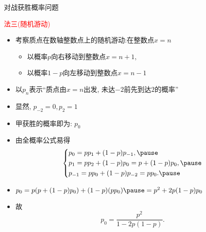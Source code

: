 \begin{frame}{对战获胜概率问题}
	\begin{jieda}
		\textcolor{red}{法三(随机游动)}
		\begin{itemize}[<+-|alert@+>]
			\item 考察质点在数轴整数点上的随机游动:在整数点$x=n$
			\begin{itemize}[<+-|alert@+>]
				\item 以概率$p$向右移动到整数点$x=n+1$,
				\item 以概率$1-p$向左移动到整数点$x=n-1$
			\end{itemize}
			\item 以$p_n$表示“质点由$x=n$出发, 未达$-2$前先到达$2$的概率”
			\item 显然, $p_{-2}=0,p_2=1$
			\item 甲获胜的概率即为: $p_0$
			\item 由全概率公式易得
			\begin{equation}
				\left\{
				\begin{aligned}
					&p_0=pp_1+(1-p)p_{-1}, \pause \\ \notag
					&p_1=pp_2+(1-p)p_0=p+(1-p)p_0, \pause \\
					&p_{-1}=pp_0+(1-p)p_{-2}=pp_0.\pause
				\end{aligned}
				\right.
			\end{equation}\pause
			\item $p_0=p(p+(1-p)p_0)+(1-p)(pp_0)\pause =p^2+2p(1-p)p_0$\pause
			\item 故 $$p_0=\dfrac{p^2}{1-2p(1-p)}.$$
		\end{itemize}
	\end{jieda}
\end{frame}






